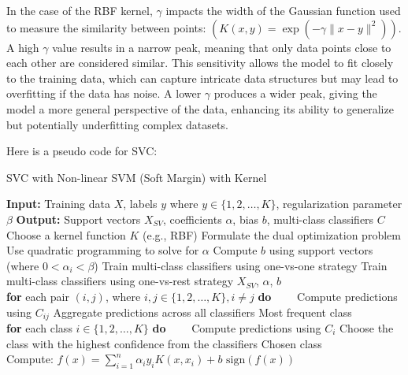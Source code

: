 \documentclass[twocolumn]{article}
\begin{document}
In the case of the RBF kernel, $\gamma$ impacts the width of the Gaussian function used to measure the similarity between points: $(K(x, y) = \exp(-\gamma \| x - y \|^2))$. A high $\gamma$ value results in a narrow peak, meaning that only data points close to each other are considered similar. This sensitivity allows the model to fit closely to the training data, which can capture intricate data structures but may lead to overfitting if the data has noise. A lower $\gamma$ produces a wider peak, giving the model a more general perspective of the data, enhancing its ability to generalize but potentially underfitting complex datasets.

Here is a pseudo code for SVC:
\begin{algorithm}
\caption{SVC with Non-linear SVM (Soft Margin) with Kernel}
\label{algo3}
\begin{algorithmic}[1]
\State \textbf{Input:} Training data $X$, labels $y$ where $y \in \{1, 2, \dots, K\}$, regularization parameter $\beta$
\State \textbf{Output:} Support vectors $X_{SV}$, coefficients $\alpha$, bias $b$, multi-class classifiers $C$
\\

    \State Choose a kernel function $K$ (e.g., RBF)
    \State Formulate the dual optimization problem
    \State Use quadratic programming to solve for $\alpha$
    \State Compute $b$ using support vectors (where $0 < \alpha_i < \beta$)
    \State Train multi-class classifiers using one-vs-one strategy
    \State Train multi-class classifiers using one-vs-rest strategy
    \State \Return $X_{SV}$, $\alpha$, $b$
\EndProcedure
\\

    \State \textbf{for} each pair $(i, j)$, where $i, j \in \{1, 2, \dots, K\}, i \neq j$ \textbf{do}
    \State \ \ \ \ Compute predictions using $C_{ij}$
    \State Aggregate predictions across all classifiers
    \State \Return Most frequent class
\EndFunction
\\

    \State \textbf{for} each class $i \in \{1, 2, \dots, K\}$ \textbf{do}
    \State \ \ \ \ Compute predictions using $C_i$
    \State Choose the class with the highest confidence from the classifiers
    \State \Return Chosen class
\EndFunction
\\

    \State Compute: $f(x) = \sum_{i=1}^n \alpha_i y_i K(x, x_i) + b$
    \State \Return $\text{sign}(f(x))$
\EndFunction
\end{algorithmic}
\end{algorithm}
\end{document}
